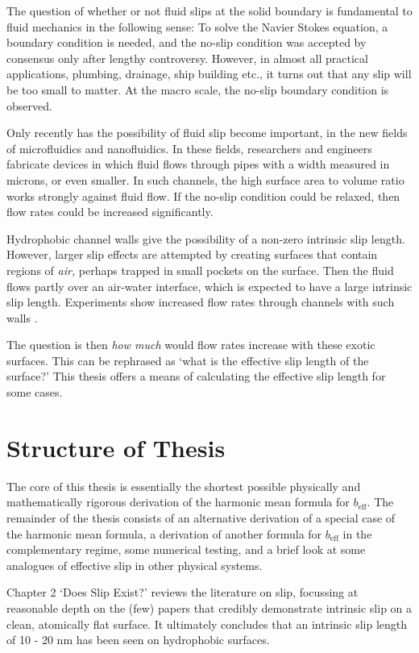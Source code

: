 \documentclass[12pt, a4paper, twoside, openright]{book}
\newcommand{\beff}{\ensuremath{b_{\mathrm{eff}}}}
\begin{document}
The question of whether or not fluid slips at the solid boundary is fundamental to fluid mechanics in the following sense: To solve the Navier Stokes equation, a boundary condition is needed, and the no-slip condition was accepted by consensus only after lengthy controversy.
However, in almost all practical applications, plumbing, drainage, ship building etc., it turns out that any slip will be too small to matter.  At the macro scale, the no-slip boundary condition is observed.

Only recently has the possibility of fluid slip become important, in the new fields of microfluidics and nanofluidics.  In these fields, researchers and engineers fabricate devices in which fluid flows through pipes with a width measured in microns, or even smaller.  In such channels, the high surface area to volume ratio works strongly against fluid flow.  If the no-slip condition could be relaxed, then flow rates could be increased significantly.

Hydrophobic channel walls give the possibility of a non-zero intrinsic slip length.  However, larger slip effects are attempted by creating surfaces that contain regions of \emph{air,} perhaps trapped in small pockets on the surface.  Then the fluid flows partly over an air-water interface, which is expected to have a large intrinsic slip length. Experiments show increased flow rates through channels with such walls \cite{OuPerotRothstein2004, HyvaluomaHarting2008}.

The question is then \emph{how much} would flow rates increase with these exotic surfaces.  This can be rephrased as `what is the effective slip length of the surface?'  This thesis offers a means of calculating the effective slip length for some cases.

\clearpage

\section{Structure of Thesis}

The core of this thesis is essentially the shortest possible physically and mathematically rigorous derivation of the harmonic mean formula for $\beff$.  The remainder of the thesis consists of an alternative derivation of a special case of the harmonic mean formula, a derivation of another formula for $\beff$ in the complementary regime, some numerical testing, and a brief look at some analogues of effective slip in other physical systems.

Chapter 2 `Does Slip Exist?' reviews the literature on slip, focussing at reasonable depth on the (few) papers that credibly demonstrate intrinsic slip on a clean, atomically flat surface.  It ultimately concludes that an intrinsic slip length of 10 - 20 nm has been seen on hydrophobic surfaces.
\end{document}
